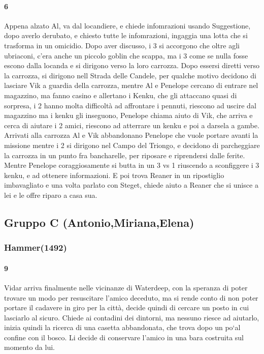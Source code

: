 \documentclass{article}
\begin{document}
                  \paragraph{6} Appena alzato Al, va dal locandiere, e chiede infomrazioni usando Suggestione, dopo averlo derubato, e chiesto tutte le infomrazioni, ingaggia una lotta che si trasforma in un omicidio. Dopo aver discusso, i 3 si accorgono che oltre agli ubriaconi, c'era anche un piccolo goblin che scappa, ma i 3 come se nulla fosse escono dalla locanda e si dirigono verso la loro carrozza. Dopo essersi diretti verso la carrozza, si dirigono nell Strada delle Candele, per qualche motivo decidono di lasciare Vik a guardia della carrozza, mentre Al e Penelope cercano di entrare nel magazzino, ma fanno casino e allertano i Kenku, che gli attaccano quasi di sorpresa, i 2 hanno molta difficoltà ad affrontare i pennuti, riescono ad uscire dal magazzino ma i kenku gli inseguono, Penelope chiama aiuto di Vik, che arriva e cerca di aiutare i 2 amici, riescono ad atterrare un kenku e poi a darsela a gambe. Arrivati alla carrozza Al e Vik abbandonano Penelope che vuole portare avanti la missione mentre i 2 si dirigono nel Campo del Triongo, e decidono di parcheggiare la carrozza in un punto fra bancharelle, per riposare e riprendersi dalle ferite. Mentre Penelope coraggiosamente si butta in un 3 vs 1 riuscendo a sconfiggere i 3 kenku, e ad ottenere informazioni. E poi trova Reaner in un ripostiglio imbavagliato e una volta parlato con Steget, chiede aiuto a Reaner che si unisce a lei e le offre riparo a casa sua.                    
\subsection{Gruppo C (Antonio,Miriana,Elena)}
\subsubsection{Hammer(1492)}
      \paragraph{9} Vidar arriva finalmente nelle vicinanze di Waterdeep, con la speranza di poter trovare un modo per resuscitare l'amico deceduto, ma si rende conto di non poter portare il cadavere in giro per la città, decide quindi di cercare un posto in cui lasciarlo al sicuro. Chiede ai contadini dei dintorni, ma nessuno riesce ad aiutarlo, inizia quindi la ricerca di una casetta abbandonata, che trova dopo un po`al confine con il bosco. Li decide di conservare l'amico in una bara costruita sul momento da lui. 
\end{document}
